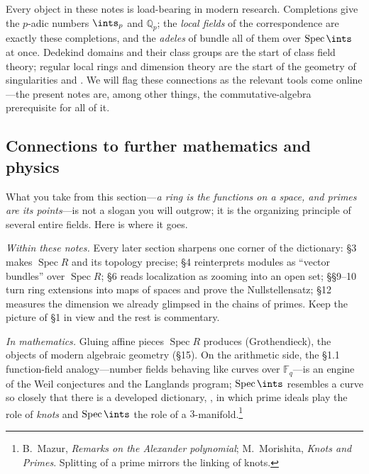 \documentclass[11pt]{article}
\DeclareMathOperator{\Spec}{Spec}
\begin{document}
\begin{nnote}
Every object in these notes is load-bearing in modern research. Completions give the
$p$-adic numbers $\ints_p$ and $\mathbb{Q}_p$; the \emph{local fields} of the
 correspondence are exactly these completions, and the \emph{adeles}
of  bundle all of them over $\Spec\ints$ at once. Dedekind domains
and their class groups are the start of class field theory; regular local rings and
dimension theory are the start of the geometry of singularities and . We will flag these connections as the relevant tools come online---the present
notes are, among other things, the commutative-algebra prerequisite for all of it.
\end{nnote}

\subsection{Connections to further mathematics and physics}

What you take from this section---\emph{a ring is the functions on a space, and primes are its
points}---is not a slogan you will outgrow; it is the organizing principle of several entire
fields. Here is where it goes.

\emph{Within these notes.} Every later section sharpens one corner of the dictionary: \S3 makes
$\Spec R$ and its topology precise; \S4 reinterprets modules as ``vector bundles'' over
$\Spec R$; \S6 reads localization as zooming into an open set; \S\S9--10 turn ring extensions
into maps of spaces and prove the Nullstellensatz; \S12 measures the dimension we already
glimpsed in the chains of primes. Keep the picture of \S1 in view and the rest is commentary.

\emph{In mathematics.} Gluing affine pieces $\Spec R$ produces  (Grothendieck),
the objects of modern algebraic geometry (\S15). On the arithmetic side, the \S1.1
function-field analogy---number fields behaving like curves over $\mathbb{F}_q$---is an engine
of the Weil conjectures and the Langlands program; $\Spec\ints$ resembles a curve so closely
that there is a developed dictionary, , in which prime ideals play
the role of \emph{knots} and $\Spec\ints$ the role of a $3$-manifold.\footnote{B.~Mazur,
\emph{Remarks on the Alexander polynomial}; M.~Morishita, \emph{Knots and Primes}. Splitting of
a prime mirrors the linking of knots.}
\end{document}
